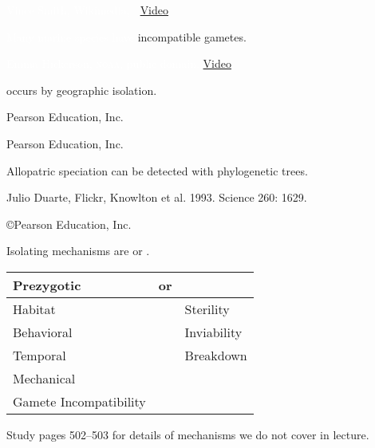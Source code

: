\documentclass[t]{beamer}
\begin{document}
%
{
\begin{frame}[b]{}
	\hfill \tiny  \textcolor{white}{Vince Smith, Wikimedia, . \href{https://www.youtube.com/watch?v=z922by9_6Fw}{Video} }
\end{frame}
}
%
{
\begin{frame}[b]{\textcolor{white}{Many marine species have} \textcolor{orange5}{incompatible gametes.}}

	\hfill \tiny \textcolor{white}{Emma Hickerson, \textsc{noaa}, public domain. \href{https://www.youtube.com/watch?v=wsaZ8-I7akg}{Video}}

\end{frame}
}
%
{
\begin{frame}[b]{ occurs by geographic isolation.}

	\hfill \tiny \textcopyright Pearson Education, Inc.

\end{frame}
}
%
{
\begin{frame}[b]

	\hfill \tiny \textcopyright Pearson Education, Inc.

\end{frame}
}
%
{
\begin{frame}[b]{Allopatric speciation can be detected with phylogenetic trees.}

	\tiny  Julio Duarte, Flickr,  \hfill Knowlton et al. 1993. Science 260: 1629.

\end{frame}
}
%
{
\begin{frame}[b]

	\tiny  \copyright Pearson Education, Inc.

\end{frame}
}
%
\begin{frame}{Isolating mechanisms are  or .}
	\vspace{2\baselineskip}
	\centering
	\begin{tabular}{l l l}
		\toprule
		{\large Prezygotic}	& or &	{\large \highlight{Postzygotic}}\\
		\midrule
		Habitat	& & Sterility \\
		Behavioral & &	Inviability \\
		Temporal	& &	Breakdown \\
		Mechanical 	& & 	\\
		Gamete Incompatibility	& & \\
		\bottomrule
	\end{tabular}

	\hangpara Study pages 502--503 for details of mechanisms we do not cover in lecture.
\end{frame}
\end{document}
